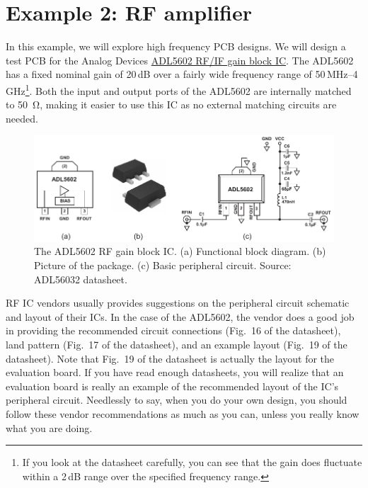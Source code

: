 \documentclass[12pt,letterpaper]{scrartcl}
\begin{document}
\newpage
\section{Example 2: RF amplifier}


In this example, we will explore high frequency PCB designs. We will design a test PCB for the Analog Devices \href{http://www.analog.com/media/en/technical-documentation/evaluation-documentation/ADL5602.pdf}{ADL5602 RF/IF gain block IC}. The ADL5602 has a fixed nominal gain of 20\,dB over a fairly wide frequency range of 50\,MHz--4\,GHz\footnote{If you look at the datasheet carefully, you can see that the gain does fluctuate within a 2\,dB range over the specified frequency range.}. Both the input and output ports of the ADL5602 are internally matched to \SI{50}{\ohm}, making it easier to use this IC as no external matching circuits are needed. 

	\begin{figure}[h]
		\centering
		\includegraphics[width=6in]{adl5602}
		\caption{The ADL5602 RF gain block IC. (a) Functional block diagram. (b) Picture of the package. (c) Basic peripheral circuit. Source: ADL56032 datasheet.}
		\label{fig:adl5602}
	\end{figure}

RF IC vendors usually provides suggestions on the peripheral circuit schematic and layout of their ICs. In the case of the ADL5602, the vendor does a good job in providing the recommended circuit connections (Fig.~16 of the datasheet), land pattern (Fig.~17 of the datasheet), and an example layout (Fig.~19 of the datasheet). Note that Fig.~19 of the datasheet is actually the layout for the evaluation board. If you have read enough datasheets, you will realize that an evaluation board is really an example of the recommended layout of the IC's peripheral circuit. Needlessly to say, when you do your own design, you should follow these vendor recommendations as much as you can, unless you really know what you are doing. 
\end{document}
